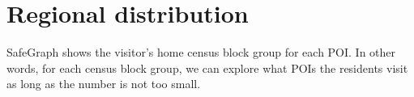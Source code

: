 \documentclass[12pt,english]{article}
\begin{document}
	
%	
%	
%	
%	
	\section{Regional distribution}
	SafeGraph shows the visitor's home census block group for each POI. In other words, for each census block group, we can explore what POIs the residents visit as long as the number is not too small.
	
\end{document}
